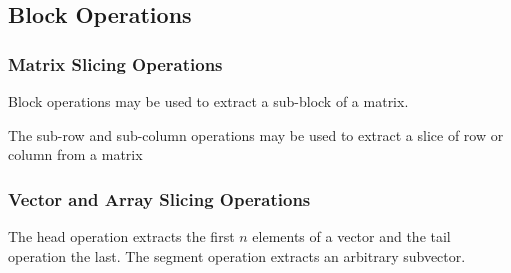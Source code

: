 \subsection{Block Operations}

\subsubsection{Matrix Slicing Operations}

Block operations may be used to extract a sub-block of a matrix.

\begin{description}
\end{description}
%
The sub-row and sub-column operations may be used to extract a
slice of row or column from a matrix
%
\begin{description}
%
%
%
\end{description}

\subsubsection{Vector and Array Slicing Operations}

The head operation extracts the first $n$ elements of a vector and
the tail operation the last.  The segment operation extracts an
arbitrary subvector.

